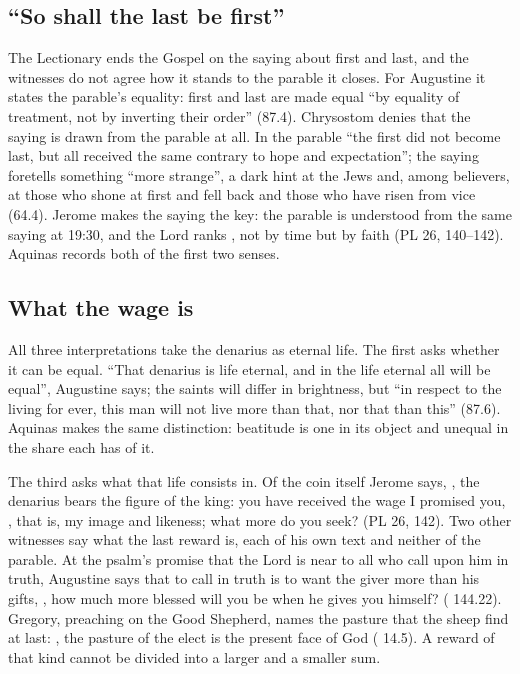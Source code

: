 \subsection{``So shall the last be first''}

The Lectionary ends the Gospel on the saying about first and last, and the
witnesses do not agree how it stands to the parable it closes. For Augustine
it states the parable's equality: first and last are made equal ``by equality
of treatment, not by inverting their order'' (87.4). Chrysostom denies that the
saying is drawn from the parable at all. In the parable ``the first did not
become last, but all received the same contrary to hope and expectation''; the
saying foretells something ``more strange'', a dark hint at the Jews and,
among believers, at those who shone at first and fell back and those who have
risen from vice (64.4). Jerome makes the saying the key: the parable is
understood from the same saying at 19:30, and the Lord ranks , not by time but by faith (PL 26, 140--142). Aquinas
records both of the first two senses.

\subsection{What the wage is}

All three interpretations take the denarius as eternal life. The first asks
whether it can be equal. ``That denarius is life eternal, and in the life
eternal all will be equal'', Augustine says; the saints will differ in
brightness, but ``in respect to the living for ever, this man will not live
more than that, nor that than this'' (87.6). Aquinas makes the same
distinction: beatitude is one in its object and unequal in the share each has
of it.

The third asks what that life consists in. Of the coin itself Jerome says,
, the denarius bears the figure of the
king: you have received the wage I promised you, , that is, my image and likeness; what more do you seek?
(PL 26, 142). Two other witnesses say what the last reward is, each of his own
text and neither of the parable. At the psalm's promise that the Lord is near
to all who call upon him in truth, Augustine says that to call in truth is to
want the giver more than his gifts, , how much more blessed will you be when he gives you himself?
( 144.22). Gregory, preaching on the Good Shepherd, names
the pasture that the sheep find at last: , the pasture of the elect is the present face of God
( 14.5). A reward of that kind cannot be divided into a larger
and a smaller sum.


